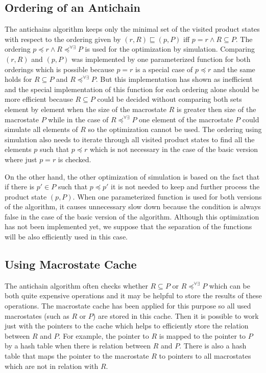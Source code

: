\subsection{Ordering of an Antichain}
The antichains algorithm keeps only the minimal set of the visited product states with respect to the ordering given by $(r,R)\sqsubseteq (p,P)$
iff $p=r \wedge R \subseteq P$. The ordering $p\preceq r \wedge R\preceq^{\forall\exists}P$ is used for the optimization by simulation.
Comparing $(r,R)$ and $(p,P)$ was implemented by one parameterized function for both orderings which is possible because $p=r$ is a special case of $p\preceq r$ 
and the same holds for $R \subseteq P$ and $R\preceq^{\forall\exists}P$. But this implementation has shown as inefficient and the special implementation of
this function for each ordering alone should be more efficient because $R\subseteq P$ could be decided 
without comparing both sets element by element when the size of the macrostate $R$ is greater then size of the macrostate $P$ while in the case of
$R\preceq^{\forall\exists}P$ one element of the macrostate $P$ could simulate all elements of $R$ so the optimization cannot be used.
The ordering using simulation also needs to iterate through all visited product states to find all the elements $p$ such that $p\preceq r$ which 
is not necessary in the case of the basic version where just $p=r$ is checked.

On the other hand, the other optimization of simulation is based on the fact that if there is $p' \in P$ such that $p \preceq p'$ 
it is not needed to keep and further process the product state $(p,P)$. When one parameterized function is used for both versions of the algorithm, it 
causes unnecessary slow down because the condition is always false in the case of the basic version of the algorithm. 
Although this optimization has not been implemented yet, we suppose that the separation of the functions will be also 
efficiently used in this case.

\subsection{Using Macrostate Cache}
The antichain algorithm often checks whether $R \subseteq P$ or $R\preceq^{\forall\exists}P$ which can be both quite expensive operations and it may be
helpful to store the results of these operations. The macrostate cache has been applied for this purpose so all used macrostates (such as $R$ or $P$) 
are stored in this cache. Then it is possible to work just with the pointers to the cache which helps to efficiently 
store the relation between $R$ and $P$. For example, the pointer to $R$ is mapped to the pointer to $P$ by a hash table when there is relation between 
$R$ and $P$. There is also a hash table that maps the pointer to the macrostate $R$ to pointers to all macrostates which are not in relation with $R$.

